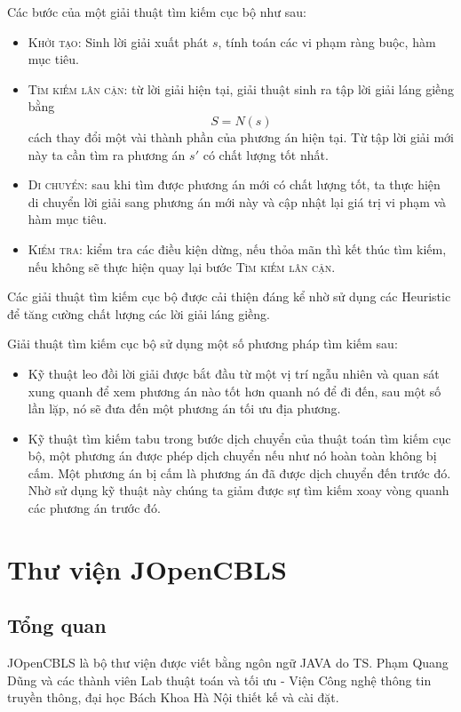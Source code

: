 Các bước của một giải thuật tìm kiếm cục bộ như sau:
\begin{itemize}
	\item \textsc{Khởi tạo:} Sinh lời giải xuất phát $s$, tính toán các vi phạm ràng buộc, hàm mục tiêu.
	\item \textsc{Tìm kiếm lân cận:} từ lời giải hiện tại, giải thuật sinh ra tập lời giải láng giềng bằng \[S = N(s)\]cách thay đổi một vài thành phần của phương án hiện tại. Từ tập lời giải mới này ta cần tìm ra phương án $s'$ có chất lượng tốt nhất.
	\item \textsc{Di chuyển:} sau khi tìm được phương án mới có chất lượng tốt, ta thực hiện di chuyển lời giải sang phương án mới này và cập nhật lại giá trị vi phạm và hàm mục tiêu.
	\item \textsc{Kiểm tra:} kiểm tra các điều kiện dừng, nếu thỏa mãn thì kết thúc tìm kiếm, nếu không sẽ thực hiện quay lại bước \textsc{Tìm kiếm lân cận}.
\end{itemize}

Các giải thuật tìm kiếm cục bộ được cải thiện đáng kể nhờ sử dụng các Heuristic để tăng cường chất lượng các lời giải láng giềng.

Giải thuật tìm kiếm cục bộ sử dụng một số phương pháp tìm kiếm sau:
\begin{itemize}
	\item Kỹ thuật leo đồi \cite{rossi2006handbookOfCp} lời giải được bắt đầu từ một vị trí ngẫu nhiên và quan sát xung quanh để xem phương án nào tốt hơn quanh nó để đi đến, sau một số lần lặp, nó sẽ đưa đến một phương án tối ưu địa phương.
	\item Kỹ thuật tìm kiếm tabu \cite{rossi2006handbookOfCp} trong bước dịch chuyển của thuật toán tìm kiếm cục bộ, một phương án được phép dịch chuyển nếu như nó hoàn toàn không bị cấm. Một phương án bị cấm là phương án đã được dịch chuyển đến trước đó. Nhờ sử dụng kỹ thuật này chúng ta giảm được sự tìm kiếm xoay vòng quanh các phương án trước đó.
\end{itemize}


\section{Thư viện JOpenCBLS}
\subsection{Tổng quan}
JOpenCBLS là bộ thư viện được viết bằng ngôn ngữ JAVA do TS. Phạm Quang Dũng và các thành viên Lab \textsf{thuật toán và tối ưu - Viện Công nghệ thông tin truyền thông, đại học Bách Khoa Hà Nội} thiết kế và cài đặt.

